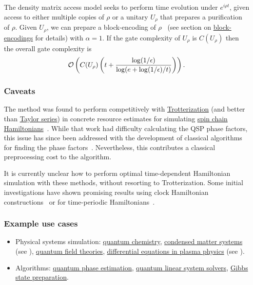 \begin{refsection}
The density matrix access model seeks to perform time evolution under $e^{i\rho t}$, given access to either multiple copies of $\rho$ or a unitary $U_\rho$ that prepares a purification of $\rho$. Given $U_\rho$, we can prepare a block-encoding of $\rho$~\cite{low2016HamSimQubitization} (see section on \hyperref[prim:BlockEncodings]{block-encodings} for details) with $\alpha=1$. If the gate complexity of $U_\rho$ is $C(U_\rho)$ then the overall gate complexity is
\begin{equation}
\mathcal{O}\left(  C(U_\rho) \left(t + \frac{\log(1/\epsilon)}{\log(e+ \log(1/\epsilon)/ t)}  \right)  \right).
\end{equation}








\subsubsection*{Caveats}
The method was found to perform competitively with \hyperref[prim:ProductFormulae]{Trotterization} (and better than \hyperref[prim:TaylorDyson]{Taylor series}) in concrete resource estimates for simulating \hyperref[appl:SpinModels]{spin chain Hamiltonians}~\cite{childs2018towardsFirstQSimSpeedup}. While that work had difficulty calculating the QSP phase factors, this issue has since been addressed with the development of classical algorithms for finding the phase factors~\cite{gilyen2018QSingValTransf, haah2018ProdDecPerFuncQSignPRoc, dong2020efficientPhaseFindingInQSP, chao2020FindingAngleSequences}. Nevertheless, this contributes a classical preprocessing cost to the algorithm.

It is currently unclear how to perform optimal time-dependent Hamiltonian simulation with these methods, without resorting to Trotterization. Some initial investigations have shown promising results using clock Hamiltonian constructions~\cite{watkins2022TimeDependentClockSimulation} or for time-periodic Hamiltonians~\cite{Mizuta2023TimePeriodicSimulation,mizuta2023MultitimePeriodicSimulation}.




\subsubsection*{Example use cases}
\begin{itemize}
\item Physical systems simulation: \hyperref[appl:QuantumChemistry]{quantum chemistry}, \hyperref[appl:CondensedMatter]{condensed matter systems} (see  \cite{childs2018towardsFirstQSimSpeedup}), \hyperref[appl:QuantumFieldTheories]{quantum field theories}, \hyperref[appl:DiffEq]{differential equations in plasma physics} (see  \cite{novikau2022PlasmaSimulation}).
\item Algorithms: \hyperref[prim:QPE]{quantum phase estimation}, \hyperref[prim:QuantumLinearSystemSolvers]{quantum linear system solvers}, \hyperref[prim:GibbsSampling]{Gibbs state preparation}.
\end{itemize}



\end{refsection}

